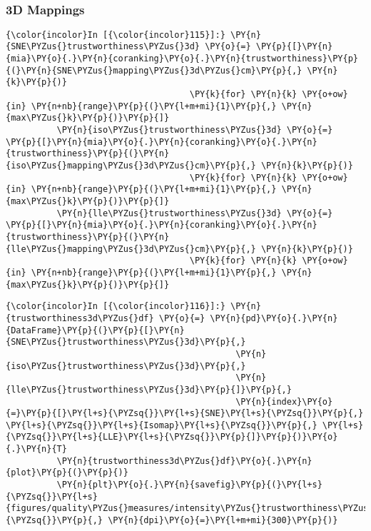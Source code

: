     \begin{center}
    \end{center}
    { \hspace*{\fill} \\}

    \subsubsection{3D Mappings}\label{d-mappings}

    \begin{Verbatim}[commandchars=\\\{\}]
{\color{incolor}In [{\color{incolor}115}]:} \PY{n}{SNE\PYZus{}trustworthiness\PYZus{}3d} \PY{o}{=} \PY{p}{[}\PY{n}{mia}\PY{o}{.}\PY{n}{coranking}\PY{o}{.}\PY{n}{trustworthiness}\PY{p}{(}\PY{n}{SNE\PYZus{}mapping\PYZus{}3d\PYZus{}cm}\PY{p}{,} \PY{n}{k}\PY{p}{)}
                                    \PY{k}{for} \PY{n}{k} \PY{o+ow}{in} \PY{n+nb}{range}\PY{p}{(}\PY{l+m+mi}{1}\PY{p}{,} \PY{n}{max\PYZus{}k}\PY{p}{)}\PY{p}{]}
          \PY{n}{iso\PYZus{}trustworthiness\PYZus{}3d} \PY{o}{=} \PY{p}{[}\PY{n}{mia}\PY{o}{.}\PY{n}{coranking}\PY{o}{.}\PY{n}{trustworthiness}\PY{p}{(}\PY{n}{iso\PYZus{}mapping\PYZus{}3d\PYZus{}cm}\PY{p}{,} \PY{n}{k}\PY{p}{)}
                                    \PY{k}{for} \PY{n}{k} \PY{o+ow}{in} \PY{n+nb}{range}\PY{p}{(}\PY{l+m+mi}{1}\PY{p}{,} \PY{n}{max\PYZus{}k}\PY{p}{)}\PY{p}{]}
          \PY{n}{lle\PYZus{}trustworthiness\PYZus{}3d} \PY{o}{=} \PY{p}{[}\PY{n}{mia}\PY{o}{.}\PY{n}{coranking}\PY{o}{.}\PY{n}{trustworthiness}\PY{p}{(}\PY{n}{lle\PYZus{}mapping\PYZus{}3d\PYZus{}cm}\PY{p}{,} \PY{n}{k}\PY{p}{)}
                                    \PY{k}{for} \PY{n}{k} \PY{o+ow}{in} \PY{n+nb}{range}\PY{p}{(}\PY{l+m+mi}{1}\PY{p}{,} \PY{n}{max\PYZus{}k}\PY{p}{)}\PY{p}{]}
\end{Verbatim}

    \begin{Verbatim}[commandchars=\\\{\}]
{\color{incolor}In [{\color{incolor}116}]:} \PY{n}{trustworthiness3d\PYZus{}df} \PY{o}{=} \PY{n}{pd}\PY{o}{.}\PY{n}{DataFrame}\PY{p}{(}\PY{p}{[}\PY{n}{SNE\PYZus{}trustworthiness\PYZus{}3d}\PY{p}{,}
                                             \PY{n}{iso\PYZus{}trustworthiness\PYZus{}3d}\PY{p}{,}
                                             \PY{n}{lle\PYZus{}trustworthiness\PYZus{}3d}\PY{p}{]}\PY{p}{,}
                                             \PY{n}{index}\PY{o}{=}\PY{p}{[}\PY{l+s}{\PYZsq{}}\PY{l+s}{SNE}\PY{l+s}{\PYZsq{}}\PY{p}{,} \PY{l+s}{\PYZsq{}}\PY{l+s}{Isomap}\PY{l+s}{\PYZsq{}}\PY{p}{,} \PY{l+s}{\PYZsq{}}\PY{l+s}{LLE}\PY{l+s}{\PYZsq{}}\PY{p}{]}\PY{p}{)}\PY{o}{.}\PY{n}{T}
          \PY{n}{trustworthiness3d\PYZus{}df}\PY{o}{.}\PY{n}{plot}\PY{p}{(}\PY{p}{)}
          \PY{n}{plt}\PY{o}{.}\PY{n}{savefig}\PY{p}{(}\PY{l+s}{\PYZsq{}}\PY{l+s}{figures/quality\PYZus{}measures/intensity\PYZus{}trustworthiness\PYZus{}3d.png}\PY{l+s}{\PYZsq{}}\PY{p}{,} \PY{n}{dpi}\PY{o}{=}\PY{l+m+mi}{300}\PY{p}{)}
\end{Verbatim}

